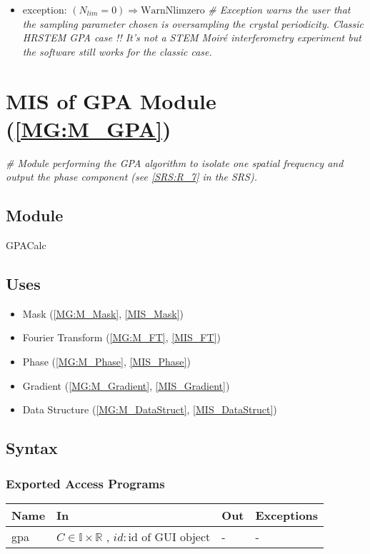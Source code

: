 \documentclass[12pt, titlepage]{article}
\begin{document}
\begin{itemize}
\item exception:
\newline
$(N_{lim}=0) \Rightarrow \text{WarnNlimzero}$
\textit{{\#} Exception warns the user that the sampling parameter chosen is 
oversampling the crystal periodicity. Classic HRSTEM GPA case !! It's not a STEM 
Moir{\'e} interferometry experiment but the software still works for the classic 
case.}

\end{itemize}

\section{MIS of GPA Module (\texorpdfstring{\cref{MG:M_GPA}}))} \label{MIS_GPA}

\noindent\textit{{\#} Module performing the GPA algorithm to isolate one spatial 
frequency and output the phase component (see \cref{SRS:R_7} in the SRS).}

\subsection{Module}
GPACalc
\subsection{Uses}
\begin{itemize}
\item Mask (\cref{MG:M_Mask}, \cref{MIS_Mask})
\item Fourier Transform (\cref{MG:M_FT}, \cref{MIS_FT})
\item Phase (\cref{MG:M_Phase}, \cref{MIS_Phase})
\item Gradient (\cref{MG:M_Gradient}, \cref{MIS_Gradient})
\item Data Structure (\cref{MG:M_DataStruct}, \cref{MIS_DataStruct})
\end{itemize}

\subsection{Syntax}

\subsubsection{Exported Access Programs}

\begin{center}
\begin{tabular}{p{2cm} p{4cm} p{4cm} p{3cm}}
\hline
\textbf{Name} & \textbf{In} & \textbf{Out} & \textbf{Exceptions} \\
\hline
gpa & $C \in \mathbb{I}\times\mathbb{R}$ , $id : \text{id of GUI object}$ & - 
& - \\
\hline
\end{tabular}
\end{center}
\end{document}
